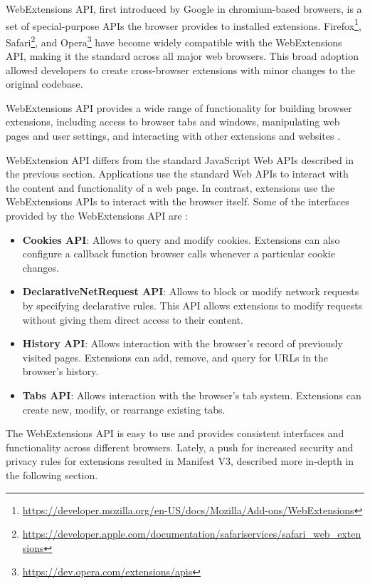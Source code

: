 WebExtensions API, first introduced by Google in chromium-based browsers, is a set of special-purpose APIs the browser provides to installed extensions. Firefox\footnote{\url{https://developer.mozilla.org/en-US/docs/Mozilla/Add-ons/WebExtensions}}, Safari\footnote{\url{https://developer.apple.com/documentation/safariservices/safari_web_extensions}}, and Opera\footnote{\url{https://dev.opera.com/extensions/apis}} have become widely compatible with the WebExtensions API, making it the standard across all major web browsers. This broad adoption allowed developers to create cross-browser extensions with minor changes to the original codebase.

WebExtensions API provides a wide range of functionality for building browser extensions, including access to browser tabs and windows, manipulating web pages and user settings, and interacting with other extensions and websites \cite{ChromeWebExtensions}.

WebExtension API differs from the standard JavaScript Web APIs described in the previous section. Applications use the standard Web APIs to interact with the content and functionality of a web page. In contrast, extensions use the WebExtensions APIs to interact with the browser itself. Some of the interfaces provided by the WebExtensions API are \cite{ChromeWebExtensions}:

\begin{itemize}
	\item \textbf{Cookies API}: Allows to query and modify cookies. Extensions can also configure a callback function browser calls whenever a particular cookie changes.
	\item \textbf{DeclarativeNetRequest API}: Allows to block or modify network requests by specifying declarative rules. This API allows extensions to modify requests without giving them direct access to their content.
	\item \textbf{History API}: Allows interaction with the browser's record of previously visited pages. Extensions can add, remove, and query for URLs in the browser's history.
	\item \textbf{Tabs API}: Allows interaction with the browser's tab system. Extensions can create new, modify, or rearrange existing tabs.
\end{itemize}

The WebExtensions API is easy to use and provides consistent interfaces and functionality across different browsers. Lately, a push for increased security and privacy rules for extensions resulted in Manifest V3, described more in-depth in the following section.

